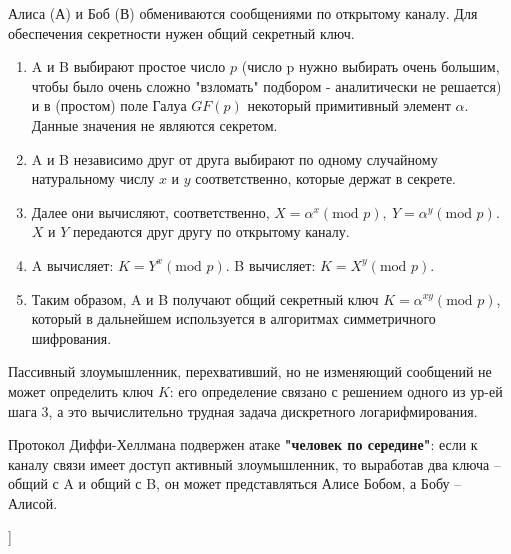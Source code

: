 Алиса (А) и Боб (В) обмениваются сообщениями по открытому каналу. 
Для обеспечения секретности нужен общий секретный ключ. 
\begin{enumerate}
    \item A и B выбирают простое число $p$ (число p нужно выбирать очень большим, чтобы было очень сложно "взломать" подбором - аналитически не решается) и в (простом) поле Галуа $GF(p)$ некоторый примитивный элемент $\alpha$.
    Данные значения не являются секретом. 
    \item A и B независимо друг от друга выбирают по одному случайному натуральному числу $x$ и $y$ соответственно, которые держат в секрете. 
    \item Далее они вычисляют, соответственно, $X = \alpha^x (\text{mod } p),~Y = \alpha^y (\text{mod } p)$.
    $X$ и $Y$ передаются друг другу по открытому каналу.
    \item A вычисляет: $K = Y^x (\text{mod } p)$.
    B вычисляет: $K = X^y (\text{mod } p)$.
    \item Таким образом, A и B получают общий секретный ключ $K = \alpha^{xy} (\text{mod } p)$, который в дальнейшем используется в алгоритмах симметричного шифрования.  
\end{enumerate}

Пассивный злоумышленник, перехвативший, но не изменяющий сообщений не может определить ключ $K$: его определение связано с решением одного из ур-ей шага 3, а это вычислительно трудная задача дискретного логарифмирования.

Протокол Диффи-Хеллмана подвержен атаке \textbf{"человек по середине"}: если к каналу связи имеет доступ активный злоумышленник, то выработав два ключа -- общий с A и общий с B, он может представляться Алисе Бобом, а Бобу -- Алисой.

\bigbreak
[\cite[page 139-151]{gurov}]